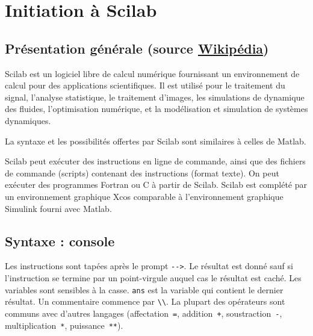 \chapter{Initiation à Scilab\label{annexe-scilab}}

\section[Présentation générale]{Présentation générale (source \href{https://fr.wikipedia.org/wiki/Scilab}{Wikipédia})}
Scilab est un logiciel libre
de calcul numérique fournissant un environnement de
calcul pour des applications scientifiques. 
Il est utilisé pour le traitement 
du signal, l'analyse statistique, 
le traitement d'images, les simulations de 
dynamique des fluides, l'optimisation numérique, et la 
modélisation et simulation de systèmes dynamiques.

La syntaxe et les possibilités offertes par Scilab sont 
similaires à celles de Matlab.

Scilab peut exécuter des instructions en ligne de commande, ainsi que 
des fichiers de commande (scripts) contenant des instructions (format texte). 
On peut exécuter des programmes Fortran ou C à partir de Scilab.
Scilab est complété par un environnement graphique Xcos comparable 
à l'environnement graphique Simulink fourni avec Matlab. 

\newpage
\section{Syntaxe : console}
Les instructions sont tapées après le prompt \verb?-->?. Le résultat est donné sauf si l'instruction se termine par 
un point-virgule auquel cas le résultat est caché.
Les variables sont sensibles à la casse.
\verb?ans? est la variable qui contient le dernier résultat.
Un commentaire commence par  \verb?\\?. 
La plupart des opérateurs sont communs avec d'autres langages (affectation~\verb?=?, addition~\verb?+?, soustraction~\verb?-?, multiplication~\verb?*?, puissance~\verb?**?).

